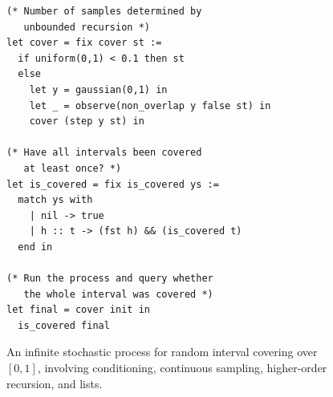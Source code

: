 \begin{figure}[t]
\begin{minipage}[t]{0.46\textwidth}
\begin{lstlisting}
(* Number of samples determined by
   unbounded recursion *)
let cover = fix cover st :=
  if uniform(0,1) < 0.1 then st
  else
    let y = gaussian(0,1) in
    let _ = observe(non_overlap y false st) in
    cover (step y st) in

(* Have all intervals been covered
   at least once? *)
let is_covered = fix is_covered ys :=
  match ys with
    | nil -> true
    | h :: t -> (fst h) && (is_covered t)
  end in

(* Run the process and query whether
   the whole interval was covered *)
let final = cover init in
  is_covered final
    \end{lstlisting}
    \end{minipage}%
    \hspace{4pt}
    
\caption{An infinite stochastic process for random interval covering over $[0,1]$, involving conditioning, continuous sampling, higher-order recursion, and lists.}
    \label{fig:app:epsball-observe}
\end{figure}

